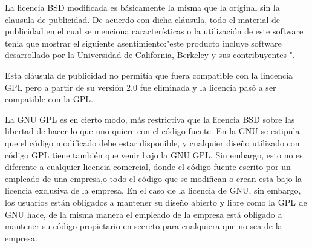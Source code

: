 \documentclass[a4paper,11pt]{article}
\begin{document}
La licencia BSD modificada es básicamente la misma que la original sin la clausula de publicidad. De acuerdo con dicha cláusula, todo el material de publicidad en el cual se menciona características o la utilización de este software tenia que mostrar el siguiente asentimiento:"este producto incluye software desarrollado por la Universidad de California, Berkeley y sus contribuyentes ".

Esta cláusula de publicidad no permitía que fuera compatible con la lincencia GPL pero a partir de su versión 2.0 fue eliminada y la licencia pasó a ser compatible con la GPL.

La GNU GPL es en cierto modo, más restrictiva que la licencia BSD sobre las libertad de hacer lo que uno quiere con el código fuente. En la GNU se estipula que el código modificado debe estar disponible, y cualquier diseño utilizado con código GPL tiene también que venir bajo la GNU GPL. Sin embargo, esto no es diferente a cualquier licencia comercial, donde el código fuente escrito por un empleado de una empresa,o todo el código que se modifican o crean esta bajo la licencia exclusiva de la empresa. En el caso de la licencia de GNU, sin embargo, los usuarios están obligados a mantener su diseño abierto y libre como la GPL de GNU hace, de la misma manera el empleado de la empresa está obligado a mantener su código propietario en secreto para cualquiera que no sea de la  empresa.
\end{document}
